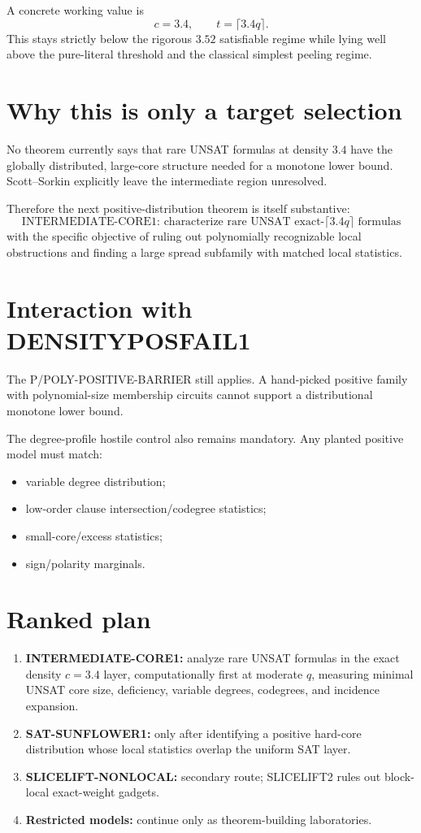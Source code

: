 \documentclass[11pt]{article}
\begin{document}
A concrete working value is
\[
\boxed{c=3.4,\qquad t=\lceil3.4q\rceil}.
\]
This stays strictly below the rigorous \(3.52\) satisfiable regime while lying well above the pure-literal threshold and the classical simplest peeling regime.

\section{Why this is only a target selection}

No theorem currently says that rare UNSAT formulas at density \(3.4\) have the globally distributed, large-core structure needed for a monotone lower bound. Scott--Sorkin explicitly leave the intermediate region unresolved.

Therefore the next positive-distribution theorem is itself substantive:
\[
\boxed{
\text{INTERMEDIATE-CORE1: characterize rare UNSAT exact-}\lceil3.4q\rceil
\text{ formulas}
}
\]
with the specific objective of ruling out polynomially recognizable local obstructions and finding a large spread subfamily with matched local statistics.

\section{Interaction with DENSITYPOSFAIL1}

The P/POLY-POSITIVE-BARRIER still applies. A hand-picked positive family with polynomial-size membership circuits cannot support a distributional monotone lower bound.

The degree-profile hostile control also remains mandatory. Any planted positive model must match:
\begin{itemize}
\item[] variable degree distribution;
\item[] low-order clause intersection/codegree statistics;
\item[] small-core/excess statistics;
\item[] sign/polarity marginals.
\end{itemize}

\section{Ranked plan}

\begin{enumerate}
\item \textbf{INTERMEDIATE-CORE1:} analyze rare UNSAT formulas in the exact density \(c=3.4\) layer, computationally first at moderate \(q\), measuring minimal UNSAT core size, deficiency, variable degrees, codegrees, and incidence expansion.
\item \textbf{SAT-SUNFLOWER1:} only after identifying a positive hard-core distribution whose local statistics overlap the uniform SAT layer.
\item \textbf{SLICELIFT-NONLOCAL:} secondary route; SLICELIFT2 rules out block-local exact-weight gadgets.
\item \textbf{Restricted models:} continue only as theorem-building laboratories.
\end{enumerate}
\end{document}
